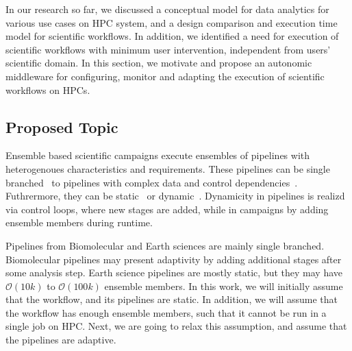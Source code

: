 In our research so far, we discussed a conceptual model for data analytics for 
various use cases on HPC system, and a design comparison and execution time 
model for scientific workflows. In addition, we identified a need for execution 
of  scientific workflows with minimum user intervention, independent from 
users' scientific domain. In this section, we motivate and propose an 
autonomic middleware for configuring, monitor and adapting the execution of 
scientific workflows on HPCs.

\subsection{Proposed Topic}
%
%

Ensemble based scientific campaigns execute ensembles of pipelines with 
heterogenoues characteristics and requirements. These pipelines can be single 
branched~\cite{paraskevakos2019workflow,dakka2018high,ramakrishnan_survey,
balasubramanian2018harnessing} to pipelines with complex data and control 
dependencies~\cite{ramakrishnan_survey,deelman2018future}. Futhrermore, they 
can be static~\cite{paraskevakos2019workflow} or dynamic~\cite{dakka2018high,
balasubramanian2018harnessing}. Dynamicity in pipelines is realizd via control 
loops, where new stages are added, while in campaigns by adding ensemble 
members during runtime.

Pipelines from Biomolecular and Earth sciences are mainly single branched. 
Biomolecular pipelines may present adaptivity by adding additional stages after 
some analysis step. Earth science pipelines are mostly static, but they may 
have $\mathcal{O}(10k)$ to $\mathcal{O}(100k)$ ensemble members. In this work, 
we will initially assume that the workflow, and its pipelines are static. In 
addition, we will assume that the workflow has enough ensemble members, such 
that it cannot be run in a single job on HPC. Next, we are going to relax this 
assumption, and assume that the pipelines are adaptive.

